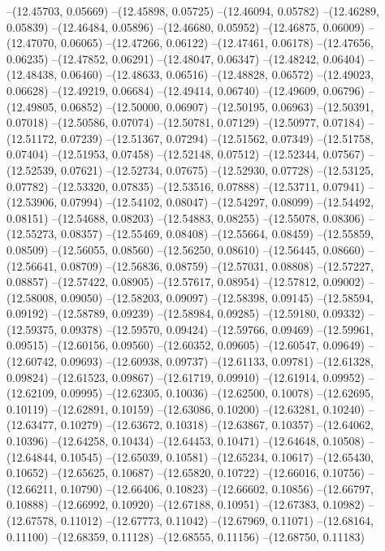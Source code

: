 --(12.45703, 0.05669)
--(12.45898, 0.05725)
--(12.46094, 0.05782)
--(12.46289, 0.05839)
--(12.46484, 0.05896)
--(12.46680, 0.05952)
--(12.46875, 0.06009)
--(12.47070, 0.06065)
--(12.47266, 0.06122)
--(12.47461, 0.06178)
--(12.47656, 0.06235)
--(12.47852, 0.06291)
--(12.48047, 0.06347)
--(12.48242, 0.06404)
--(12.48438, 0.06460)
--(12.48633, 0.06516)
--(12.48828, 0.06572)
--(12.49023, 0.06628)
--(12.49219, 0.06684)
--(12.49414, 0.06740)
--(12.49609, 0.06796)
--(12.49805, 0.06852)
--(12.50000, 0.06907)
--(12.50195, 0.06963)
--(12.50391, 0.07018)
--(12.50586, 0.07074)
--(12.50781, 0.07129)
--(12.50977, 0.07184)
--(12.51172, 0.07239)
--(12.51367, 0.07294)
--(12.51562, 0.07349)
--(12.51758, 0.07404)
--(12.51953, 0.07458)
--(12.52148, 0.07512)
--(12.52344, 0.07567)
--(12.52539, 0.07621)
--(12.52734, 0.07675)
--(12.52930, 0.07728)
--(12.53125, 0.07782)
--(12.53320, 0.07835)
--(12.53516, 0.07888)
--(12.53711, 0.07941)
--(12.53906, 0.07994)
--(12.54102, 0.08047)
--(12.54297, 0.08099)
--(12.54492, 0.08151)
--(12.54688, 0.08203)
--(12.54883, 0.08255)
--(12.55078, 0.08306)
--(12.55273, 0.08357)
--(12.55469, 0.08408)
--(12.55664, 0.08459)
--(12.55859, 0.08509)
--(12.56055, 0.08560)
--(12.56250, 0.08610)
--(12.56445, 0.08660)
--(12.56641, 0.08709)
--(12.56836, 0.08759)
--(12.57031, 0.08808)
--(12.57227, 0.08857)
--(12.57422, 0.08905)
--(12.57617, 0.08954)
--(12.57812, 0.09002)
--(12.58008, 0.09050)
--(12.58203, 0.09097)
--(12.58398, 0.09145)
--(12.58594, 0.09192)
--(12.58789, 0.09239)
--(12.58984, 0.09285)
--(12.59180, 0.09332)
--(12.59375, 0.09378)
--(12.59570, 0.09424)
--(12.59766, 0.09469)
--(12.59961, 0.09515)
--(12.60156, 0.09560)
--(12.60352, 0.09605)
--(12.60547, 0.09649)
--(12.60742, 0.09693)
--(12.60938, 0.09737)
--(12.61133, 0.09781)
--(12.61328, 0.09824)
--(12.61523, 0.09867)
--(12.61719, 0.09910)
--(12.61914, 0.09952)
--(12.62109, 0.09995)
--(12.62305, 0.10036)
--(12.62500, 0.10078)
--(12.62695, 0.10119)
--(12.62891, 0.10159)
--(12.63086, 0.10200)
--(12.63281, 0.10240)
--(12.63477, 0.10279)
--(12.63672, 0.10318)
--(12.63867, 0.10357)
--(12.64062, 0.10396)
--(12.64258, 0.10434)
--(12.64453, 0.10471)
--(12.64648, 0.10508)
--(12.64844, 0.10545)
--(12.65039, 0.10581)
--(12.65234, 0.10617)
--(12.65430, 0.10652)
--(12.65625, 0.10687)
--(12.65820, 0.10722)
--(12.66016, 0.10756)
--(12.66211, 0.10790)
--(12.66406, 0.10823)
--(12.66602, 0.10856)
--(12.66797, 0.10888)
--(12.66992, 0.10920)
--(12.67188, 0.10951)
--(12.67383, 0.10982)
--(12.67578, 0.11012)
--(12.67773, 0.11042)
--(12.67969, 0.11071)
--(12.68164, 0.11100)
--(12.68359, 0.11128)
--(12.68555, 0.11156)
--(12.68750, 0.11183)
